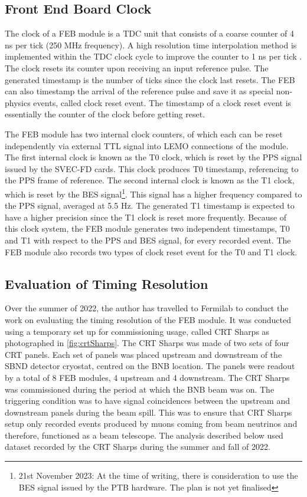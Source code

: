 
\subsection{Front End Board Clock}

The clock of a FEB module is a TDC unit that consists of a coarse counter of 4 ns per tick (250 MHz frequency). 
A high resolution time interpolation method is implemented within the TDC clock cycle to improve the counter to 1 ns per tick \cite{crt_clock}.
The clock resets its counter upon receiving an input reference pulse.  
The generated timestamp is the number of ticks since the clock last resets.
The FEB can also timestamp the arrival of the reference pulse and save it as special non-physics events, called clock reset event.
The timestamp of a clock reset event is essentially the counter of the clock before getting reset.

The FEB module has two internal clock counters, of which each can be reset independently via external TTL signal into LEMO connections of the module.
The first internal clock is known as the T0 clock, which is reset by the PPS signal issued by the SVEC-FD cards. 
This clock produces T0 timestamp, referencing to the PPS frame of reference.
The second internal clock is known as the T1 clock, which is reset by the BES signal\footnote{21st November 2023: At the time of writing, there is consideration to use the BES signal issued by the PTB hardware. The plan is not yet finalised}.
This signal has a higher frequency compared to the PPS signal, averaged at 5.5 Hz.
The generated T1 timestamp is expected to have a higher precision since the T1 clock is reset more frequently. 
Because of this clock system, the FEB module generates two independent timestamps, T0 and T1 with respect to the PPS and BES signal, for every recorded event.
The FEB module also records two types of clock reset event for the T0 and T1 clock.

\subsection{Evaluation of Timing Resolution}

Over the summer of 2022, the author has travelled to Fermilab to conduct the work on evaluating the timing resolution of the FEB module.
It was conducted using a temporary set up for commissioning usage, called CRT Sharps as photographed in \ref{fig:crtSharps}.
The CRT Sharps was made of two sets of four CRT panels. 
Each set of panels was placed upstream and downstream of the SBND detector cryostat, centred on the BNB location.
The panels were readout by a total of 8 FEB modules, 4 upstream and 4 downstream.
The CRT Sharps was commissioned during the period at which the BNB beam was on. 
The triggering condition was to have signal coincidences between the upstream and downstream panels during the beam spill.
This was to ensure that CRT Sharps setup only recorded events produced by muons coming from beam neutrinos and therefore, functioned as a beam telescope.
The analysis described below used dataset recorded by the CRT Sharps during the summer and fall of 2022.

